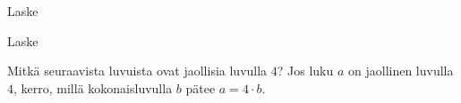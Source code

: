 \begin{tehtavasivu}
\begin{tehtava}
    \begin{vastaus}
        \begin{alakohdat}
        \end{alakohdat}
    \end{vastaus}
\end{tehtava}

\begin{tehtava}
Laske
    \begin{alakohdat}
    \end{alakohdat}
\begin{vastaus}
    \begin{alakohdat}
    \end{alakohdat}
\end{vastaus}
\end{tehtava}

\begin{tehtava}
Laske
    \begin{alakohdat}
    \end{alakohdat}
\begin{vastaus}
    \begin{alakohdat}
    \end{alakohdat}
\end{vastaus}
\end{tehtava}

\begin{tehtava}
	Mitkä seuraavista luvuista ovat jaollisia luvulla $4$?
	Jos luku $a$ on jaollinen luvulla $4$, kerro, millä kokonaisluvulla $b$ pätee $a = 4 \cdot b$. 
	\begin{alakohdatrivi}
	\end{alakohdatrivi}
	\begin{vastaus}
		\begin{alakohdat}
		\end{alakohdat}
    \end{vastaus}
\end{tehtava}


\end{tehtavasivu}
